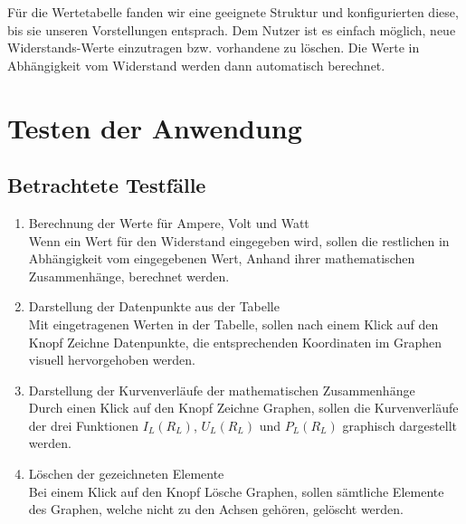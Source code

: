 \documentclass[a4paper]{article}
\begin{document}
    Für die Wertetabelle fanden wir eine geeignete Struktur und konfigurierten diese, bis sie unseren Vorstellungen entsprach.
    Dem Nutzer ist es einfach möglich, neue Widerstands-Werte einzutragen bzw. vorhandene zu löschen.
    Die Werte in Abhängigkeit vom Widerstand werden dann automatisch berechnet.

\newpage
\section{Testen der Anwendung}

\subsection{Betrachtete Testfälle}

    \begin{enumerate}
        \item Berechnung der Werte für Ampere, Volt und Watt\\
        \label{test:calc}
        Wenn ein Wert für den Widerstand eingegeben wird, sollen die restlichen in Abhängigkeit vom eingegebenen Wert, Anhand ihrer mathematischen Zusammenhänge, berechnet werden.
        
        \item Darstellung der Datenpunkte aus der Tabelle\\
        \label{test:point}
        Mit eingetragenen Werten in der Tabelle, sollen nach einem Klick auf den Knopf \glqq Zeichne Datenpunkte\grqq{}, die entsprechenden Koordinaten im Graphen visuell hervorgehoben werden.
        
        \item Darstellung der Kurvenverläufe der mathematischen Zusammenhänge\\
        \label{test:curve}
        Durch einen Klick auf den Knopf \glqq Zeichne Graphen\grqq{}, sollen die Kurvenverläufe der drei Funktionen $I_L(R_L)$, $U_L(R_L)$ und $P_L(R_L)$ graphisch dargestellt werden.
        
        \item Löschen der gezeichneten Elemente\\
        \label{test:delete}
        Bei einem Klick auf den Knopf \glqq Lösche Graphen\grqq{}, sollen sämtliche Elemente des Graphen, welche nicht zu den Achsen gehören, gelöscht werden.
        
    \end{enumerate}
\end{document}
